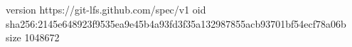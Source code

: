 version https://git-lfs.github.com/spec/v1
oid sha256:2145e648923f9535ea9e45b4a93fd3f35a132987855acb93701bf54ecf78a06b
size 1048672
